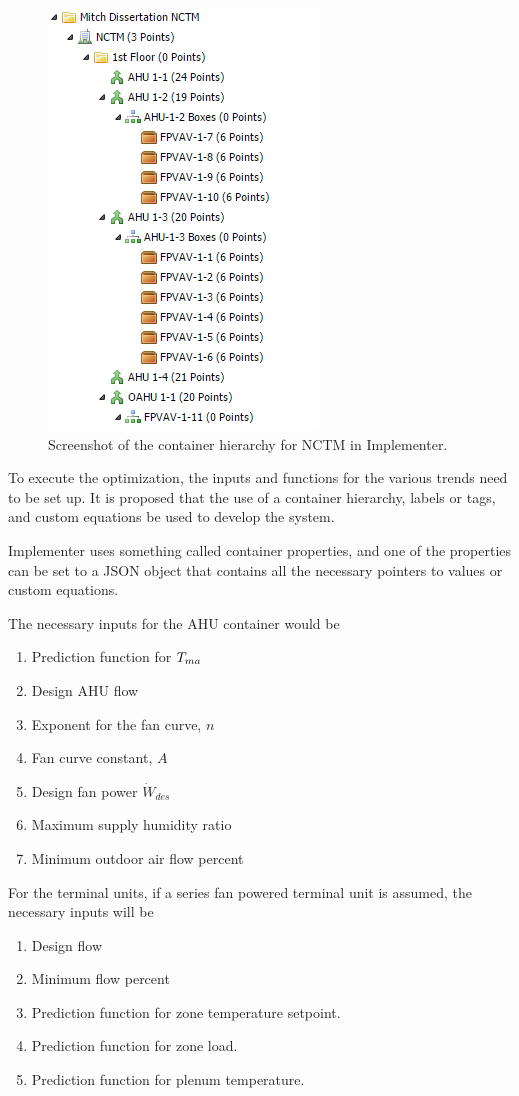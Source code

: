 \begin{figure}
\centering
\includegraphics{Images/ContainerHierarchy.PNG}
\caption{Screenshot of the container hierarchy for NCTM in Implementer.}
\label{fig:ContainerHierarchy}
\end{figure}

To execute the optimization, the inputs and functions for the
various trends need to be set up. It is proposed that the use of a
container hierarchy, labels or tags, and custom equations be used to
develop the system.

Implementer uses something called container properties, and one of the
properties can be set to a JSON object that contains all the necessary
pointers to values or custom equations.

The necessary inputs for the AHU container would be 
\begin{enumerate}
    \item Prediction function for \(T_{ma}{}\) 
    \item Design AHU flow 
    \item Exponent for the fan curve, \(n\)
    \item Fan curve constant, \(A\)
    \item Design fan power \(\dot{W}_{des}\)
    \item Maximum supply humidity ratio
    \item Minimum outdoor air flow percent
\end{enumerate}
For the terminal units, if a series fan powered
terminal unit is assumed, the necessary inputs will be
\begin{enumerate}
    \item Design flow
    \item Minimum flow percent
    \item Prediction function for zone temperature setpoint.
    \item Prediction function for zone load.
    \item Prediction function for plenum temperature.
\end{enumerate}

